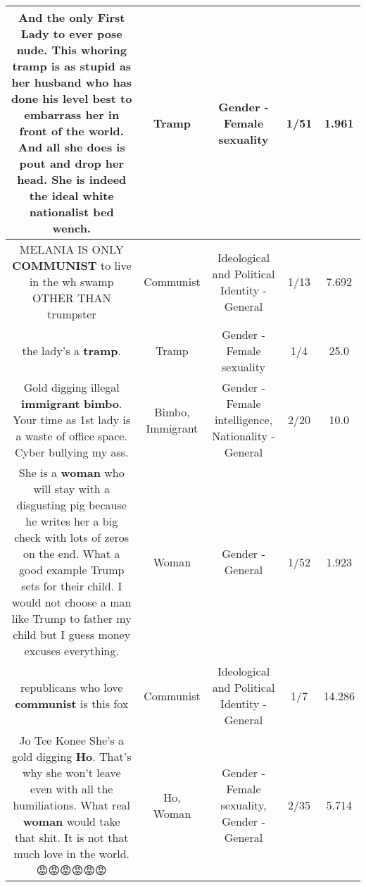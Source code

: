 \documentclass[11pt]{article}
\newlength\mylength
\begin{document}
\begin{center}
\begin{longtable}{|C{.65\mylength}|C{.30\mylength}|C{.12\mylength}|C{.12\mylength}|C{.12\mylength}|}
  \small And the only First Lady to ever pose nude. This whoring \textbf{tramp} is as stupid as her husband who has done his level best to embarrass her in front of the world. And all she does is pout and drop her head.  She is indeed the ideal white nationalist bed wench.\normalsize   & Tramp & Gender - Female sexuality & 1/51 & 1.961 \\  \hline
  \small MELANIA IS ONLY \textbf{COMMUNIST} to live in the wh swamp OTHER THAN trumpster\normalsize   & Communist &  Ideological and Political Identity - General & 1/13 & 7.692 \\  \hline
  \small the lady's a \textbf{tramp}.\normalsize   & Tramp & Gender - Female sexuality & 1/4 & 25.0 \\  \hline
  \small Gold digging illegal \textbf{immigrant} \textbf{bimbo}. Your time as 1st lady is a waste of office space. Cyber bullying my ass.\normalsize   & Bimbo, Immigrant & Gender - Female intelligence, Nationality - General & 2/20 & 10.0 \\  \hline
  \small She is a \textbf{woman} who will stay with a disgusting pig because he writes her a big check with lots of zeros on the end. What a good example Trump sets for their child. I would not choose a man like Trump to father my child but I guess money excuses everything.\normalsize   & Woman & Gender - General & 1/52 & 1.923 \\  \hline
  \small republicans who love \textbf{communist} is this fox\normalsize   & Communist &  Ideological and Political Identity - General & 1/7 & 14.286 \\  \hline
  \small Jo Tee Konee She's a gold digging \textbf{Ho}. That's why she won't leave even with all the humiliations.  What real \textbf{woman} would take that shit.  It is not that much love in the world. 😡😡😡😡😡😡\normalsize   & Ho, Woman & Gender - Female sexuality, Gender - General & 2/35 & 5.714 \\  \hline

\end{longtable}
\end{center}
\end{document}

